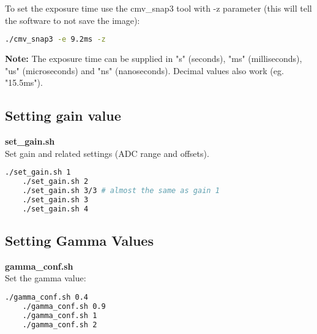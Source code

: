 To set the exposure time use the cmv\_snap3 tool with -z parameter (this will tell the software to not save the image): 

\begin{lstlisting}[language=bash,morekeywords=$,keywordstyle=\bfseries,frame=none,xleftmargin=.25in,belowskip=2em, aboveskip=2em]
./cmv_snap3 -e 9.2ms -z
\end{lstlisting}

\textbf{Note:} The exposure time can be supplied in "s" (seconds), "ms" (milliseconds), "us" (microseconds) and "ns" (nanoseconds). Decimal values also work (eg. "15.5ms"). 



\subsection{Setting gain value}

\textbf{set\_gain.sh}\\

Set gain and related settings (ADC range and offsets). 

\begin{lstlisting}[language=bash,morekeywords=$,keywordstyle=\bfseries,frame=none,xleftmargin=.25in,belowskip=2em]
    ./set_gain.sh 1 
    ./set_gain.sh 2
    ./set_gain.sh 3/3 # almost the same as gain 1
    ./set_gain.sh 3
    ./set_gain.sh 4
\end{lstlisting}



\subsection{Setting Gamma Values}

\textbf{gamma\_conf.sh}\\

Set the gamma value: 

\begin{lstlisting}[language=bash,morekeywords=$,keywordstyle=\bfseries,frame=none,xleftmargin=.25in,belowskip=2em]
    ./gamma_conf.sh 0.4
    ./gamma_conf.sh 0.9
    ./gamma_conf.sh 1
    ./gamma_conf.sh 2
\end{lstlisting}

